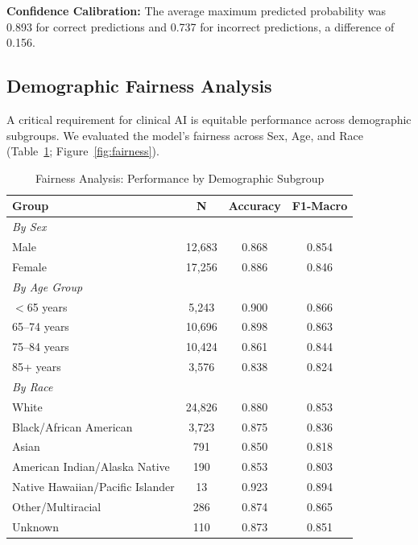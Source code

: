 \documentclass[preprint,12pt]{elsarticle}
\begin{document}
\textbf{Confidence Calibration:} The average maximum predicted probability was 0.893 for correct predictions and 0.737 for incorrect predictions, a difference of 0.156.

\subsection{Demographic Fairness Analysis}

A critical requirement for clinical AI is equitable performance across demographic subgroups. We evaluated the model's fairness across Sex, Age, and Race (Table~\ref{tab:fairness}; Figure~\ref{fig:fairness}).

\begin{table}[htbp]
\caption{Fairness Analysis: Performance by Demographic Subgroup}
\label{tab:fairness}
\begin{center}
\begin{tabular}{lccc}
\toprule
\textbf{Group} & \textbf{N} & \textbf{Accuracy} & \textbf{F1-Macro} \\
\midrule
\multicolumn{4}{l}{\textit{By Sex}} \\
Male & 12,683 & 0.868 & 0.854 \\
Female & 17,256 & 0.886 & 0.846 \\
\midrule
\multicolumn{4}{l}{\textit{By Age Group}} \\
$<$65 years & 5,243 & 0.900 & 0.866 \\
65--74 years & 10,696 & 0.898 & 0.863 \\
75--84 years & 10,424 & 0.861 & 0.844 \\
85+ years & 3,576 & 0.838 & 0.824 \\
\midrule
\multicolumn{4}{l}{\textit{By Race}} \\
White & 24,826 & 0.880 & 0.853 \\
Black/African American & 3,723 & 0.875 & 0.836 \\
Asian & 791 & 0.850 & 0.818 \\
American Indian/Alaska Native & 190 & 0.853 & 0.803 \\
Native Hawaiian/Pacific Islander & 13 & 0.923 & 0.894 \\
Other/Multiracial & 286 & 0.874 & 0.865 \\
Unknown & 110 & 0.873 & 0.851 \\
\bottomrule
\end{tabular}
\end{center}
\end{table}
\end{document}
